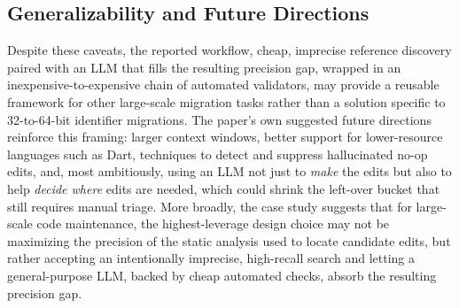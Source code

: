 \subsection{Generalizability and Future Directions}
Despite these caveats, the reported workflow, cheap, imprecise
reference discovery paired with an LLM that fills the resulting
precision gap, wrapped in an inexpensive-to-expensive chain of
automated validators, may provide a reusable framework for other
large-scale migration tasks rather than a solution specific to
32-to-64-bit identifier migrations. The paper's own suggested future
directions reinforce this framing: larger context windows, better
support for lower-resource languages such as Dart, techniques to
detect and suppress hallucinated no-op edits, and, most ambitiously,
using an LLM not just to \emph{make} the edits but also to help
\emph{decide where} edits are needed, which could shrink the
left-over bucket that still requires manual triage. More broadly, the
case study suggests that for large-scale code maintenance, the
highest-leverage design choice may not be maximizing the precision of
the static analysis used to locate candidate edits, but rather
accepting an intentionally imprecise, high-recall search and letting
a general-purpose LLM, backed by cheap automated checks, absorb the
resulting precision gap.